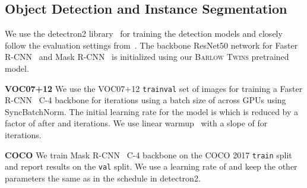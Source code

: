 \documentclass{article}
\newcommand{\AlgoName}{\textsc{Barlow Twins}}
\begin{document}
\subsection{Object Detection and Instance Segmentation}
We use the detectron2 library~\cite{wu2019detectron2} for training the detection models and closely follow the evaluation settings from~\cite{he2019momentum}. The backbone ResNet50 network for Faster R-CNN~\cite{ren2015faster} and Mask R-CNN~\cite{he2017mask} is initialized using our \AlgoName{} pretrained model.

\par \noindent \textbf{VOC07+12} We use the VOC07+12 \texttt{trainval} set of  images for training a Faster R-CNN~\cite{ren2015faster} C-4 backbone for  iterations using a batch size of  across  GPUs using SyncBatchNorm. The initial learning rate for the model is  which is reduced by a factor of  after  and  iterations. We use linear warmup~\cite{goyal2017accurate} with a slope of  for  iterations.
\par \noindent \textbf{COCO} We train Mask R-CNN~\cite{he2017mask} C-4 backbone on the COCO 2017 \texttt{train} split and report results on the \texttt{val} split. We use a learning rate of  and keep the other parameters the same as in the  schedule in detectron2.



 
\end{document}
